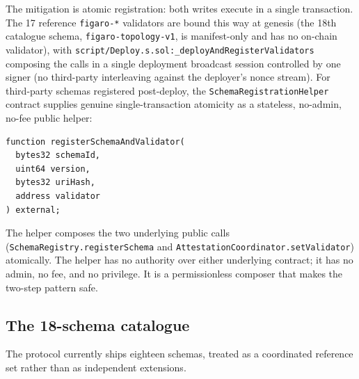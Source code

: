 \documentclass[11pt,a4paper]{article}
\theoremstyle{definition}
\theoremstyle{remark}
\begin{document}
The mitigation is atomic registration: both writes execute in a
single transaction. The 17 reference \texttt{figaro-*} validators
are bound this way at genesis (the 18th catalogue schema,
\texttt{figaro-topology-v1}, is manifest-only and has no on-chain
validator), with
\texttt{script/Deploy.s.sol:\_deployAndRegisterValidators}
composing the calls in a single deployment broadcast session
controlled by one signer (no third-party interleaving against the
deployer's nonce stream). For third-party schemas registered
post-deploy, the \texttt{SchemaRegistrationHelper} contract supplies
genuine single-transaction atomicity as a stateless, no-admin,
no-fee public helper:

\begin{lstlisting}
function registerSchemaAndValidator(
  bytes32 schemaId,
  uint64 version,
  bytes32 uriHash,
  address validator
) external;
\end{lstlisting}

The helper composes the two underlying public calls
(\texttt{SchemaRegistry.registerSchema} and
\texttt{AttestationCoordinator.setValidator}) atomically. The
helper has no authority over either underlying contract; it has no
admin, no fee, and no privilege. It is a permissionless composer
that makes the two-step pattern safe.

\subsection{The 18-schema catalogue}

The protocol currently ships eighteen schemas, treated as a
coordinated reference set rather than as independent extensions.
\end{document}
